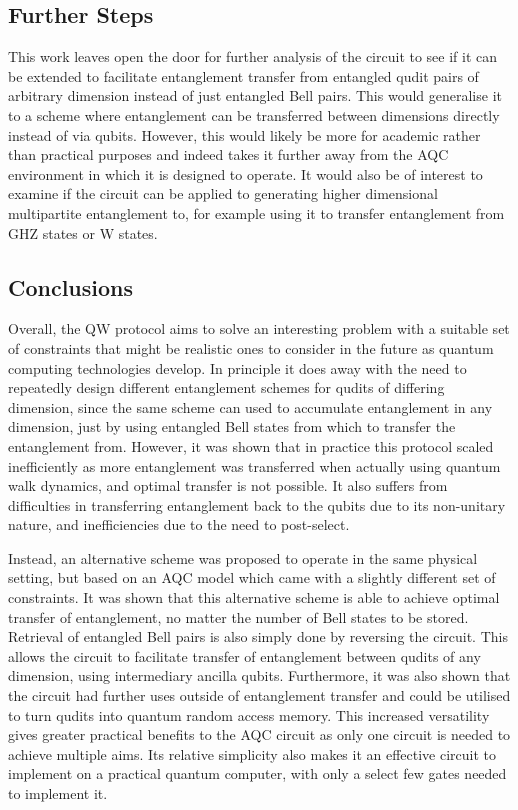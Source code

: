 \subsection{Further Steps}
\label{subsection:furthersteps}
This work leaves open the door for further analysis of the circuit to see if it can be extended to facilitate entanglement transfer from entangled qudit pairs of arbitrary dimension instead of just entangled Bell pairs.
This would generalise it to a scheme where entanglement can be transferred between dimensions directly instead of via qubits.
However, this would likely be more for academic rather than practical purposes and indeed takes it further away from the AQC environment in which it is designed to operate.
It would also be of interest to examine if the circuit can be applied to generating higher dimensional multipartite entanglement to, for example using it to transfer entanglement from GHZ states or W states.


\subsection{Conclusions}
\label{subsection:conclusions}
Overall, the QW protocol aims to solve an interesting problem with a suitable set of constraints that might be realistic ones to consider in the future as quantum computing technologies develop.
In principle it does away with the need to repeatedly design different entanglement schemes for qudits of differing dimension, since the same scheme can used to accumulate entanglement in any dimension, just by using entangled Bell states from which to transfer the entanglement from.
However, it was shown that in practice this protocol scaled inefficiently as more entanglement was transferred when actually using quantum walk dynamics, and optimal transfer is not possible.
It also suffers from difficulties in transferring entanglement back to the qubits due to its non-unitary nature, and inefficiencies due to the need to post-select.

Instead, an alternative scheme was proposed to operate in the same physical setting, but based on an AQC model which came with a slightly different set of constraints.
It was shown that this alternative scheme is able to achieve optimal transfer of entanglement, no matter the number of Bell states to be stored.
Retrieval of entangled Bell pairs is also simply done by reversing the circuit.
This allows the circuit to facilitate transfer of entanglement between qudits of any dimension, using intermediary ancilla qubits.
Furthermore, it was also shown that the circuit had further uses outside of entanglement transfer and could be utilised to turn qudits into quantum random access memory.
This increased versatility gives greater practical benefits to the AQC circuit as only one circuit is needed to achieve multiple aims.
Its relative simplicity also makes it an effective circuit to implement on a practical quantum computer, with only a select few gates needed to implement it.